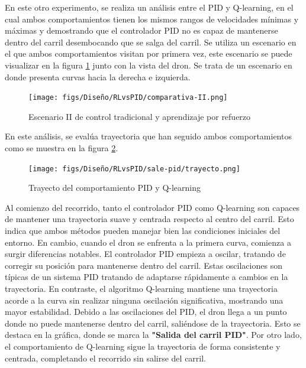 En este otro experimento, se realiza un análisis entre el PID y Q-learning, en el cual ambos comportamientos tienen los mismos rangos de velocidades mínimas y máximas y demostrando que
el controlador PID no es capaz de mantenerse dentro del carril desembocando que se salga 
del carril. Se utiliza un escenario en el que ambos comportamientos visitan por primera vez, este escenario se puede visualizar en la figura \ref{fig:escenario-comparativa-II} junto 
con la vista del dron. Se trata de un escenario en donde presenta curvas hacia la derecha e izquierda.

\begin{figure} [H]
  \begin{center}
    \texttt{[image: figs/Diseño/RLvsPID/comparativa-II.png]}
  \end{center}
  \caption{Escenario II de control tradicional y aprendizaje por refuerzo}
  \label{fig:escenario-comparativa-II}
  \vspace{-1.5em}
\end{figure}

En este análisis, se evalúa trayectoria que han seguido ambos comportamientos como se muestra en la figura \ref{fig:Trayecto-II}. 

\begin{figure} [H]
  \begin{center}
    \texttt{[image: figs/Diseño/RLvsPID/sale-pid/trayecto.png]}
  \end{center}
  \caption{Trayecto del comportamiento PID y Q-learning}
  \label{fig:Trayecto-II}
  \vspace{-1.5em}
\end{figure}

Al comienzo del recorrido, tanto el controlador PID como Q-learning
son capaces de mantener una trayectoria suave y centrada respecto al centro del carril. Esto indica que ambos métodos pueden manejar bien las condiciones iniciales del entorno. En cambio, cuando 
el dron se enfrenta a la primera curva, comienza a surgir diferencias notables. El controlador PID empieza a oscilar, tratando de corregir su posición para mantenerse dentro del carril. Estas 
oscilaciones son típicas de un sistema PID tratando de adaptarse rápidamente a cambios en la trayectoria. En contraste, el algoritmo Q-learning mantiene una trayectoria acorde a la curva 
sin realizar ninguna oscilación significativa, mostrando una mayor estabilidad. Debido a las oscilaciones del PID, el dron llega a un punto donde no puede mantenerse dentro del carril, saliéndose 
de la trayectoria. Esto se destaca en la gráfica, donde se marca la \textbf{"Salida del carril PID"}. Por otro lado, el comportamiento de Q-learning sigue la trayectoria  de forma consistente 
y centrada, completando el recorrido sin salirse del carril.


